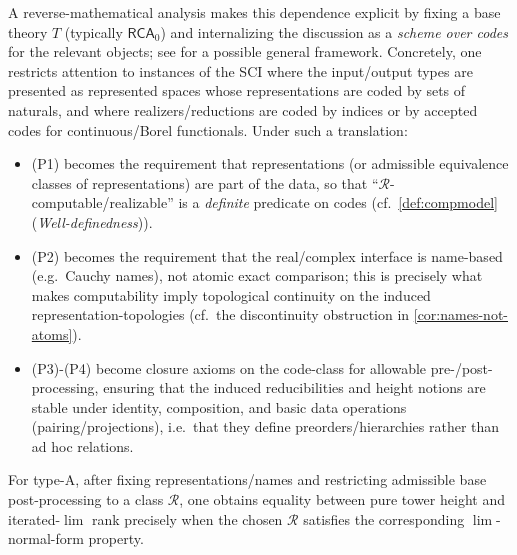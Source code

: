 \documentclass{lmcs} %
\theoremstyle{plain}
\theoremstyle{plain}
\theoremstyle{definition}
\theoremstyle{remark}
\theoremstyle{definition}
\theoremstyle{remark}
\numberwithin{equation}{section}
\newcommand{\Lim}{\operatorname{lim}}
\begin{document}
A reverse-mathematical analysis makes this dependence explicit by fixing a base theory
$T$ (typically $\mathsf{RCA}_0$) and internalizing the discussion as a \textit{scheme over codes}
for the relevant objects; see \cite{simpson09secAr} for a possible general framework.
Concretely, one restricts attention to instances of the SCI where the input/output types
are presented as represented spaces whose representations are coded by sets of naturals, and
where realizers/reductions are coded by indices or by accepted codes
for continuous/Borel functionals.  Under such a translation:
\begin{itemize}
\item (P1) becomes the requirement that representations (or admissible equivalence classes of
representations) are part of the data, so that \enquote{$\mathcal R$-computable/realizable} is a
\textit{definite} predicate on codes (cf.\ \cref{def:compmodel}(\textit{Well-definedness})).
\item (P2) becomes the requirement that the real/complex interface is name-based (e.g.\ Cauchy
names), not atomic exact comparison; this is precisely what makes computability imply
topological continuity on the induced representation-topologies (cf.\ the discontinuity obstruction in \cref{cor:names-not-atoms}).
\item (P3)-(P4) become closure axioms on the code-class for allowable pre-/post-processing,
ensuring that the induced reducibilities and height notions are stable under identity,
composition, and basic data operations (pairing/projections), i.e.\ that they define
preorders/hierarchies rather than ad hoc relations.
\end{itemize}
For type-A, after fixing representations/names and restricting admissible base
post-processing to a class $\mathcal R$, one obtains equality between pure tower
height and iterated-$\Lim$ rank precisely when the chosen $\mathcal R$ satisfies the
corresponding $\Lim$-normal-form property.
\end{document}
